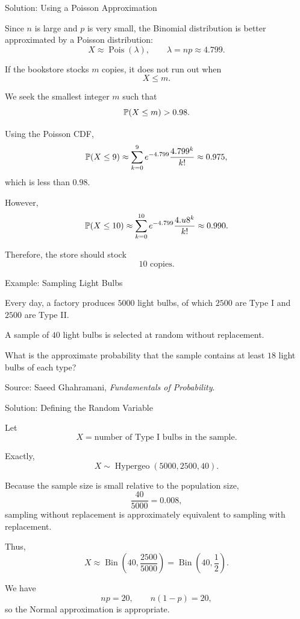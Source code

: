 \begin{frame}{Solution: Using a Poisson Approximation}

Since \(n\) is large and \(p\) is very small, the Binomial distribution is
better approximated by a Poisson distribution:
\[
X\approx\operatorname{Pois}(\lambda),
\qquad
\lambda=np\approx4.799.
\]

If the bookstore stocks \(m\) copies, it does not run out when
\[
X\leq m.
\]

We seek the smallest integer \(m\) such that
\[
\mathbb{P}(X\leq m)>0.98.
\]

Using the Poisson CDF,
\[
\mathbb{P}(X\leq9)
\approx
\sum_{k=0}^{9}
e^{-4.799}\frac{4.799^k}{k!}
\approx
0.975,
\]
which is less than \(0.98\).

However,
\[
\mathbb{P}(X\leq10)
\approx
\sum_{k=0}^{10}
e^{-4.799}\frac{4.u8^k}{k!}
\approx
0.990.
\]

Therefore, the store should stock
\[
\boxed{10\text{ copies}.}
\]

\end{frame}

\begin{frame}{Example: Sampling Light Bulbs}

Every day, a factory produces \(5000\) light bulbs, of which \(2500\) are
Type I and \(2500\) are Type II.

A sample of \(40\) light bulbs is selected at random without replacement.

What is the approximate probability that the sample contains at least
\(18\) light bulbs of each type?

\vfill

{\scriptsize
Source: Saeed Ghahramani, \emph{Fundamentals of Probability}.
}

\end{frame}


\begin{frame}{Solution: Defining the Random Variable}

Let
\[
X=\text{number of Type I bulbs in the sample}.
\]

Exactly,
\[
X\sim\operatorname{Hypergeo}(5000,2500,40).
\]

Because the sample size is small relative to the population size,
\[
\frac{40}{5000}=0.008,
\]
sampling without replacement is approximately equivalent to sampling with
replacement.

Thus,
\[
X
\approx
\operatorname{Bin}\left(40,\frac{2500}{5000}\right)
=
\operatorname{Bin}\left(40,\frac12\right).
\]

We have
\[
np=20,
\qquad
n(1-p)=20,
\]
so the Normal approximation is appropriate.

\end{frame}


